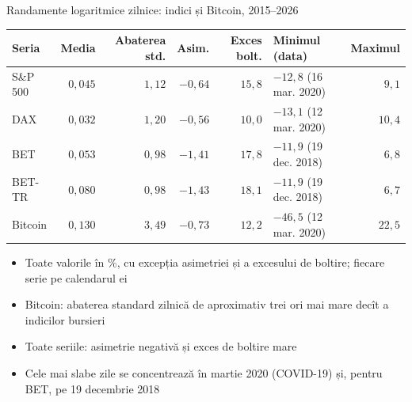 \begin{frame}{Randamente logaritmice zilnice: indici și Bitcoin, 2015--2026}
\itemsize{\small}
\begin{center}
\footnotesize
\begin{tabular}{lrrrrlr}
\toprule
Seria & Media & Abaterea std. & Asim. & Exces bolt. & Minimul (data) & Maximul \\
\midrule
S\&P 500 & $0{,}045$ & $1{,}12$ & $-0{,}64$ & $15{,}8$ & $-12{,}8$ (16 mar. 2020) & $9{,}1$ \\
DAX & $0{,}032$ & $1{,}20$ & $-0{,}56$ & $10{,}0$ & $-13{,}1$ (12 mar. 2020) & $10{,}4$ \\
BET & $0{,}053$ & $0{,}98$ & $-1{,}41$ & $17{,}8$ & $-11{,}9$ (19 dec. 2018) & $6{,}8$ \\
BET-TR & $0{,}080$ & $0{,}98$ & $-1{,}43$ & $18{,}1$ & $-11{,}9$ (19 dec. 2018) & $6{,}7$ \\
Bitcoin & $0{,}130$ & $3{,}49$ & $-0{,}73$ & $12{,}2$ & $-46{,}5$ (12 mar. 2020) & $22{,}5$ \\
\bottomrule
\end{tabular}
\end{center}
\begin{itemize}
    \item Toate valorile în \%, cu excepția asimetriei și a excesului de boltire; fiecare serie pe calendarul ei
    \item Bitcoin: abaterea standard zilnică de aproximativ trei ori mai mare decît a indicilor bursieri
    \item Toate seriile: asimetrie negativă și exces de boltire mare
    \item Cele mai slabe zile se concentrează în martie 2020 (COVID-19) și, pentru BET, pe 19 decembrie 2018
\end{itemize}
\end{frame}


